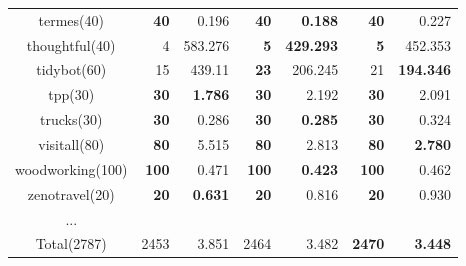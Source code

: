 \begin{center}
\begin{tabular}{c rr rr rr}
    termes(40)      & \textbf{40}   & 0.196             & \textbf{40}   & \textbf{0.188}      & \textbf{40}   & 0.227 \\
    thoughtful(40)  & 4             & 583.276           & \textbf{5}    & \textbf{429.293}    & \textbf{5}    & 452.353 \\
    tidybot(60)     & 15            & 439.11            & \textbf{23}   & 206.245             & 21            & \textbf{194.346} \\
    tpp(30)         & \textbf{30}   & \textbf{1.786}    & \textbf{30}   & 2.192               & \textbf{30}   & 2.091 \\
    trucks(30)      & \textbf{30}   & 0.286             & \textbf{30}   & \textbf{0.285}      & \textbf{30}   & 0.324\\
    visitall(80)    & \textbf{80}   & 5.515             & \textbf{80}   & 2.813               & \textbf{80}   & \textbf{2.780} \\
    woodworking(100)& \textbf{100}  & 0.471             & \textbf{100}  & \textbf{0.423}      & \textbf{100}  & 0.462 \\
    zenotravel(20)  & \textbf{20}   & \textbf{0.631}    & \textbf{20}   & 0.816               & \textbf{20}   & 0.930 \\
    ...\\
    \midrule
    Total(2787) & 2453 & 3.851 & 2464 & 3.482 & \textbf{2470} & \textbf{3.448} \\
    \bottomrule
 \end{tabular}
\end{center}